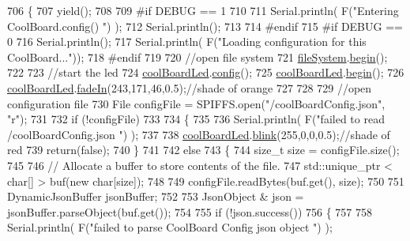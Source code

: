 \begin{DoxyCode}
706 \{
707     yield();
708 
709 \textcolor{preprocessor}{#if DEBUG == 1}
710 
711     Serial.println( F(\textcolor{stringliteral}{"Entering CoolBoard.config() "}) );
712     Serial.println();
713 
714 \textcolor{preprocessor}{#endif}
715 \textcolor{preprocessor}{#if DEBUG == 0}
716     Serial.println();
717     Serial.println( F(\textcolor{stringliteral}{"Loading configuration for this CoolBoard..."}));
718 \textcolor{preprocessor}{#endif }
719 
720     \textcolor{comment}{//open file system}
721     \hyperlink{class_cool_board_a42c2586fbb13ff7f06538e9284e8538d}{fileSystem}.\hyperlink{class_cool_file_system_a6ba6f666ed4c530174f8569d2c636748}{begin}();
722     
723     \textcolor{comment}{//start the led}
724     \hyperlink{class_cool_board_a1b1d3c684a5baa56b08486e192fd8e97}{coolBoardLed}.\hyperlink{class_cool_board_led_a1b60e5e30bea96c49ed62ed1bf1ffc8b}{config}();
725     \hyperlink{class_cool_board_a1b1d3c684a5baa56b08486e192fd8e97}{coolBoardLed}.\hyperlink{class_cool_board_led_ae3cbde8affcc6f011cbd698c8ef911f6}{begin}();
726     \hyperlink{class_cool_board_a1b1d3c684a5baa56b08486e192fd8e97}{coolBoardLed}.\hyperlink{class_cool_board_led_ab778f5e7bed0ab74e3906d82110493c3}{fadeIn}(243,171,46,0.5);\textcolor{comment}{//shade of orange     }
727 
728     
729     \textcolor{comment}{//open configuration file}
730     File configFile = SPIFFS.open(\textcolor{stringliteral}{"/coolBoardConfig.json"}, \textcolor{stringliteral}{"r"});
731     
732     \textcolor{keywordflow}{if} (!configFile)
733 
734     \{
735     
736         Serial.println( F(\textcolor{stringliteral}{"failed to read /coolBoardConfig.json  "}) );
737 
738         \hyperlink{class_cool_board_a1b1d3c684a5baa56b08486e192fd8e97}{coolBoardLed}.\hyperlink{class_cool_board_led_a96e1ea13003eee34c9dbcef340404426}{blink}(255,0,0,0.5);\textcolor{comment}{//shade of red     }
739         \textcolor{keywordflow}{return}(\textcolor{keyword}{false});
740     \}
741 
742     \textcolor{keywordflow}{else}
743     \{
744         \textcolor{keywordtype}{size\_t} size = configFile.size();
745 
746         \textcolor{comment}{// Allocate a buffer to store contents of the file.}
747         std::unique\_ptr < char[] > buf(\textcolor{keyword}{new} \textcolor{keywordtype}{char}[size]);
748 
749         configFile.readBytes(buf.get(), size);
750 
751         DynamicJsonBuffer jsonBuffer;
752 
753         JsonObject & json = jsonBuffer.parseObject(buf.get());
754 
755         \textcolor{keywordflow}{if} (!json.success())
756         \{
757         
758             Serial.println( F(\textcolor{stringliteral}{"failed to parse CoolBoard Config json object "}) );

\end{DoxyCode}
